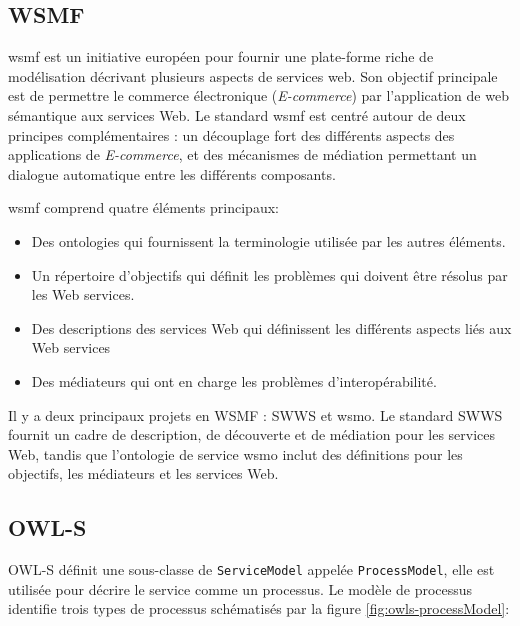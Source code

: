   \subsection{WSMF}
  \label{sec:wsmf}
  \acrshort{wsmf} \cite{fensel2002web} est un initiative européen pour
  fournir une plate-forme riche de modélisation décrivant plusieurs
  aspects de services web. Son objectif principale est de permettre le
  commerce électronique (\emph{E-commerce}) par l'application de web
  sémantique aux services Web.  Le standard \acrshort{wsmf} est centré
  autour de deux principes complémentaires \cite{baryannis2010}: un
  découplage fort des différents aspects des applications de
  \textit{E-commerce}, et des mécanismes de médiation permettant un
  dialogue automatique entre les différents composants.\medskip

  \acrshort{wsmf} comprend quatre éléments principaux:

  \SpecialItem
  \begin{itemize}
  \item Des ontologies qui fournissent la terminologie utilisée par
    les autres éléments.

  \item Un répertoire d'objectifs qui définit les problèmes qui
    doivent être résolus par les Web services.

  \item Des descriptions des services Web qui définissent les
    différents aspects liés aux Web services

  \item Des médiateurs qui ont en charge les problèmes
    d'interopérabilité.
  \end{itemize}
  \enddescription

  Il y a deux principaux projets en WSMF : \textsc{SWWS} et
  \acrshort{wsmo}. Le standard \textsc{SWWS} fournit un cadre de
  description, de découverte et de médiation pour les services Web,
  tandis que l'ontologie de service \acrshort{wsmo} inclut des
  définitions pour les objectifs, les médiateurs et les services Web.

  \subsection{OWL-S}
  \label{sec:owl-s}

  

  \textsc{OWL-S} définit une sous-classe de \verb|ServiceModel|
  appelée \verb|ProcessModel|, elle est utilisée pour décrire le
  service comme un processus. Le modèle de processus identifie trois
  types de processus schématisés par la figure
  \ref{fig:owls-processModel}:

